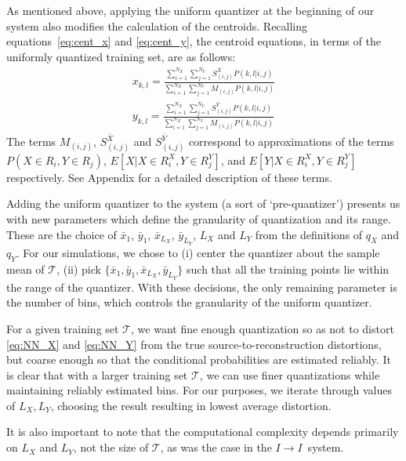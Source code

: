 \documentclass[10pt,twoside,titlepage]{article}
\newcommand{\sysII}{\mbox{$I \rightarrow I$}}
\begin{document}
As mentioned above, applying the uniform quantizer at the beginning of our system also modifies the calculation of the centroids. Recalling equations~\eqref{eq:cent_x} and \eqref{eq:cent_y}, the centroid equations, in terms of the uniformly quantized training set, are as follows:
\begin{align}
    \label{eq:C_X}
    x_{k,l} = 
        \frac{\sum_{i=1}^{N_X} \sum_{j=1}^{N_Y}
        S_{(i,j)}^{\bar X} P(k,l|i,j)}
        {\sum_{i=1}^{N_X} \sum_{j=1}^{N_Y}
        M_{(i,j)} P(k,l|i,j)}\\
    \label{eq:C_Y}
    y_{k,l} = 
        \frac{\sum_{i=1}^{N_X} \sum_{j=1}^{N_Y}
        S_{(i,j)}^{\bar Y} P(k,l|i,j)}
        {\sum_{i=1}^{N_X} \sum_{j=1}^{N_Y}
        M_{(i,j)} P(k,l|i,j)}
\end{align}
The terms $M_{(i,j)}$, $S_{(i,j)}^{\bar X}$ and $S_{(i,j)}^{\bar Y}$ correspond to approximations of the terms $P(X \in R_i, Y \in R_j)$, $E[X|X \in R_i^X, Y \in R_j^Y]$, and $E[Y|X \in R_i^X, Y \in R_j^Y]$ respectively. See Appendix for a detailed description of these terms.

Adding the uniform quantizer to the system (a sort of `pre-quantizer') presents us with new parameters which define the granularity of quantization and its range. These are  the choice of $\bar x_1$, $\bar y_1$, $\bar x_{L_X}$, $\bar y_{L_Y}$, $L_X$ and $L_Y$ from the definitions of $q_X$ and $q_Y$. For our simulations, we chose to (i) center the quantizer about the sample mean of $\mathcal T$, (ii) pick $\{\bar x_1, \bar y_1, \bar x_{L_X}, \bar y_{L_Y}\}$ such that all the training points lie within the range of the quantizer. With these decisions, the only remaining parameter is the number of bins, which controls the granularity of the uniform quantizer.

For a given training set $\mathcal T$, we want fine enough quantization so as  not to distort  \eqref{eq:NN_X} and \eqref{eq:NN_Y} from the true source-to-reconstruction distortions, but coarse enough so that the conditional probabilities are estimated reliably. It is clear that with a larger training set $\mathcal T$, we can use finer quantizations while maintaining reliably estimated bins. For our purposes, we iterate through values of $L_X, L_Y$, choosing the result resulting in lowest average distortion.

It is also important to note that the computational complexity depends primarily on  $L_X$ and $L_Y$, not the size of $\mathcal T$, as was the case in the \sysII\ system.
\end{document}
